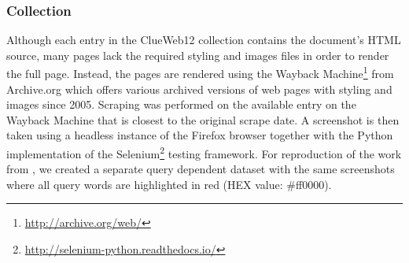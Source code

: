 

\subsubsection{Collection}
Although each entry in the ClueWeb12 collection contains the document's HTML source, many pages lack the required styling and images files in order to render the full page. Instead, the pages are rendered using the Wayback Machine\footnote{\url{http://archive.org/web/}} from Archive.org which offers various archived versions of web pages with styling and images since 2005. Scraping was performed on the available entry on the Wayback Machine that is closest to the original scrape date. A screenshot is then taken using a headless instance of the Firefox browser together with the Python implementation of the Selenium\footnote{\url{http://selenium-python.readthedocs.io/}} testing framework. 
For reproduction of the work from \citet{fan2017learning}, we created a separate query dependent dataset with the same screenshots where all query words are highlighted in red (HEX value: \#ff0000).

